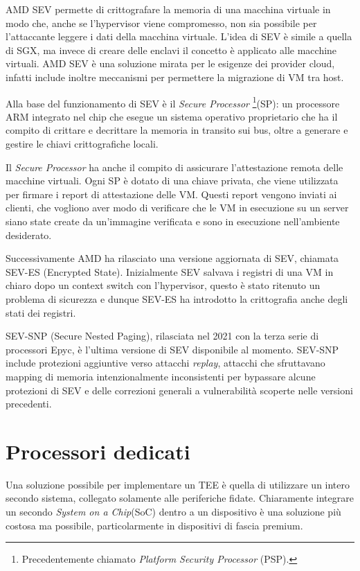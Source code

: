 \documentclass[12pt,italian]{report}
\begin{document}
AMD SEV permette di crittografare la memoria di una macchina virtuale in
modo che, anche se l'hypervisor viene compromesso, non sia possibile per
l'attaccante leggere i dati della macchina virtuale.
L'idea di SEV è simile a quella di SGX, ma invece di creare delle enclavi
il concetto è applicato alle macchine virtuali.
AMD SEV è una soluzione mirata per le esigenze dei provider cloud,
infatti include inoltre meccanismi per permettere la migrazione di VM
tra host.

Alla base del funzionamento di SEV è il \textit{Secure Processor}
\footnote{
    Precedentemente chiamato \textit{Platform Security Processor} (PSP).
}(SP): 
un processore ARM integrato nel chip che esegue un sistema operativo
proprietario che ha il compito di crittare e decrittare la memoria
in transito sui bus, oltre a generare e gestire le chiavi crittografiche
locali.

Il \textit{Secure Processor} ha anche il compito di assicurare
l'attestazione remota delle macchine virtuali.
Ogni SP è dotato di una chiave privata, che viene utilizzata
per firmare i report di attestazione delle VM. Questi report vengono
inviati ai clienti, che vogliono aver modo di verificare che le VM
in esecuzione su un server siano state create da un'immagine verificata
e sono in esecuzione nell'ambiente desiderato.

\medbreak

Successivamente AMD ha rilasciato una versione aggiornata di SEV, chiamata
SEV-ES (Encrypted State)\cite{sev_es}. Inizialmente SEV salvava i registri
di una VM in chiaro dopo un context switch con l'hypervisor, questo è
stato ritenuto un problema di sicurezza e dunque SEV-ES ha introdotto la
crittografia anche degli stati dei registri.

\medbreak \noindent

SEV-SNP (Secure Nested Paging)\cite{sev_snp}, rilasciata nel 2021
con la terza serie di processori Epyc, è l'ultima versione di SEV
disponibile al momento.
SEV-SNP include protezioni aggiuntive verso
attacchi \textit{replay}, attacchi che sfruttavano mapping di memoria
intenzionalmente inconsistenti per bypassare alcune protezioni di SEV
e delle correzioni generali a vulnerabilità scoperte nelle versioni 
precedenti.

\section{Processori dedicati}
\label{sec:processori-dedicati}
Una soluzione possibile per implementare un TEE è quella di utilizzare
un intero secondo sistema, collegato solamente alle periferiche fidate.
Chiaramente integrare un secondo \textit{System on a Chip}(SoC) dentro
a un dispositivo è una soluzione più costosa ma possibile, particolarmente
in dispositivi di fascia premium.
\end{document}
